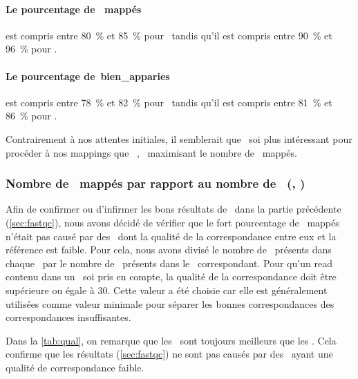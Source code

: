 \documentclass[../main]{subfiles} %
\begin{document}
\paragraph{Le pourcentage de \reads mappés} est compris entre 80 \% et 85 \% pour \TrMo tandis qu'il est compris entre 90 \% et 96 \% pour \TrEx.

\paragraph{Le pourcentage de \reads\,\gls{bien_apparies}} est compris entre 78 \% et 82 \% pour \TrMo tandis qu'il est compris entre 81 \% et 86 \% pour \TrEx.

Contrairement à nos attentes initiales, il semblerait que \TrEx soi plus intéressant pour procéder à nos \glspl{mapping} que \TrMo , \TrEx maximisant le nombre de \reads mappés.



\subsubsection{Nombre de \reads mappés par rapport au nombre de \contigs (\BamTrEx, \BamTrMo)}
Afin de confirmer ou d'infirmer les bons résultats de \TrEx dans la partie précédente (\cref{sec:fastqc}), nous avons décidé de vérifier que le fort pourcentage de \reads mappés n'était pas causé par des \reads dont la qualité de la correspondance entre eux et la référence est faible. Pour cela, nous avons divisé le nombre de \reads présents dans chaque \bam par le nombre de \reads présents dans le \fastq correspondant. Pour qu'un \gls{read} contenu dans un \bam soi pris en compte, la qualité de la correspondance doit être supérieure ou égale à 30. Cette valeur a été choisie car elle est généralement utilisées comme valeur minimale pour séparer les bonnes correspondances des correspondances insuffisantes.






Dans la \cref{tab:qual}, on remarque que les \BamTrEx sont toujours meilleurs que les \BamTrMo. Cela confirme que les résultats (\cref{sec:fastqc}) ne sont pas causés par des \reads ayant une qualité de correspondance faible.
\end{document}
